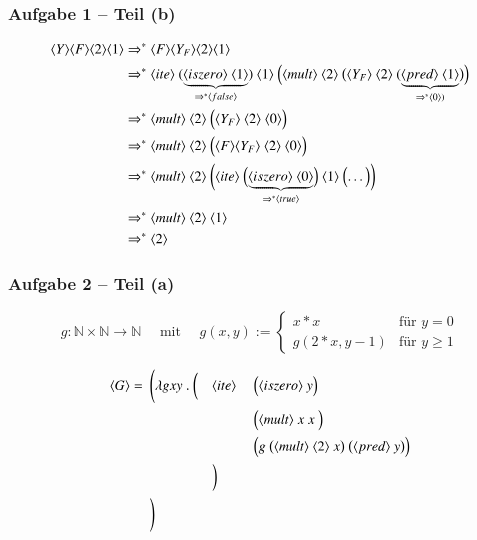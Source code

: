 \documentclass[aspectratio=1610,onlymath, ngerman]{beamer}
\newcommand{\num}[1]{\ensuremath{\langle #1 \rangle}}
\begin{document}
	\begin{frame} \frametitle{Aufgabe 1 -- Teil (b)}
	\small
		\begin{align*}
			\num{Y} \num{F} \num{2} \num{1} &\Rightarrow^\ast \num{F} \num{Y_F} \num{2} \num{1} \\
			&\Rightarrow^\ast \num{ite} \ 
			(\underbrace{\num{iszero} \ \num{1}}_{\Rightarrow^\ast \num{false}}) \ \num{1} \ \Bigl( \num{mult} \ \num{2} \ \bigl( \num{Y_F} \ \num{2} \ (\underbrace{\num{pred} \ \num{1}}_{\Rightarrow^\ast \num{0})} \bigr) \Bigr) \\
			&\Rightarrow^\ast \num{mult} \ \num{2} \ \Bigl( \num{Y_F} \ \num{2} \ \num{0} \Bigr) \\
			&\Rightarrow^\ast \num{mult} \ \num{2} \ \Bigl( \num{F} \num{Y_F} \ \num{2} \ \num{0} \Bigr) \\
			&\Rightarrow^\ast \num{mult} \ \num{2} \ \biggl( \num{ite} \ \Bigl( \underbrace{\num{iszero} \ \num{0}}_{\Rightarrow^\ast \num{true}} \Bigr) \ \num{1} \ \Bigl( \dots \Bigr) \biggr) \\
			&\Rightarrow^\ast \num{mult} \ \num{2} \ \num{1} \\
			&\Rightarrow^\ast \num{2}
		\end{align*}
	\end{frame}
	
	\begin{frame} \frametitle{Aufgabe 2 -- Teil (a)}
	\small
		\begin{equation*}
			g \colon \mathbb{N} \times \mathbb{N} \to \mathbb{N} \quad \text{ mit } \quad g(x,y) := \begin{cases}
			x * x & \text{für } y=0 \\
			g(2*x,y-1) & \text{für } y \ge 1 
			\end{cases}
		\end{equation*}
		
		\medskip
		\pause
		
		\begin{alignat*}{3}
			\num{G} = \enskip & \Biggl( \lambda g xy \ . \ \biggl( &&\num{ite} \ && \Bigl( \num{iszero} \ y \Bigr) \\
			&&&&& \Bigl( \num{mult} \ x \ x \ \Bigr) \\
			&&&&& \Bigl( g \ \bigl( \num{mult} \ \num{2} \ x \bigr) \ \bigl( \num{pred} \ y \bigr) \Bigr) \\
			&&& \biggr) \\
			& \Biggr)
		\end{alignat*}
	\end{frame}
\end{document}
